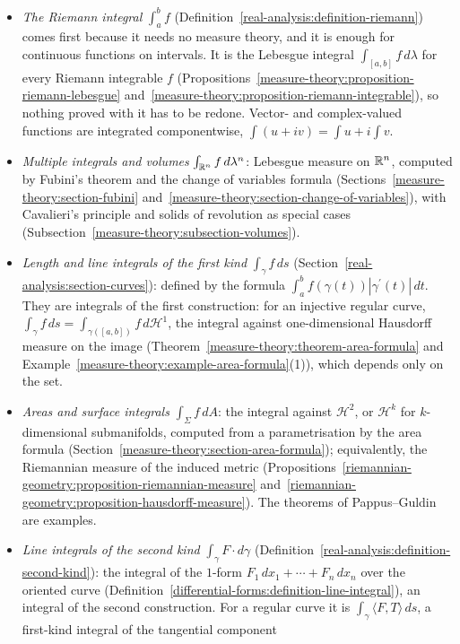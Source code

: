 \begin{itemize}
\item \emph{The Riemann integral} $\int_a^bf$ (Definition~\ref{real-analysis:definition-riemann}) comes first because it needs no measure theory, and it is enough for continuous functions on intervals. It is the
Lebesgue integral $\int_{[a,b]}f\,d\lambda$ for every Riemann integrable $f$ (Propositions~\ref{measure-theory:proposition-riemann-lebesgue} and~\ref{measure-theory:proposition-riemann-integrable}), so nothing proved
with it has to be redone. Vector- and complex-valued functions are integrated componentwise, $\int(u + iv) = \int u + i\int v$.
\item \emph{Multiple integrals and volumes} $\int_{\mathbb{R}^n}f\,d\lambda^n$: Lebesgue measure on $\mathbb{R}^n$, computed by Fubini's theorem and the change of variables formula
(Sections~\ref{measure-theory:section-fubini} and~\ref{measure-theory:section-change-of-variables}), with Cavalieri's principle and solids of revolution as special cases
(Subsection~\ref{measure-theory:subsection-volumes}).
\item \emph{Length and line integrals of the first kind} $\int_\gamma f\,ds$ (Section~\ref{real-analysis:section-curves}): defined by the formula $\int_a^bf(\gamma(t))|\gamma^{\prime}(t)|\,dt$. They are integrals of the first
construction: for an injective regular curve, $\int_\gamma f\,ds = \int_{\gamma([a,b])}f\,d\mathcal{H}^1$, the integral against one-dimensional Hausdorff measure on the image (Theorem~\ref{measure-theory:theorem-area-formula} and
Example~\ref{measure-theory:example-area-formula}(1)), which depends only on the set.
\item \emph{Areas and surface integrals} $\int_\Sigma f\,dA$: the integral against $\mathcal{H}^2$, or $\mathcal{H}^k$ for $k$-dimensional submanifolds, computed from a parametrisation by the area formula
(Section~\ref{measure-theory:section-area-formula}); equivalently, the Riemannian measure of the induced metric (Propositions~\ref{riemannian-geometry:proposition-riemannian-measure}
and~\ref{riemannian-geometry:proposition-hausdorff-measure}). The theorems of Pappus--Guldin are examples.
\item \emph{Line integrals of the second kind} $\int_\gamma F \cdot d\gamma$ (Definition~\ref{real-analysis:definition-second-kind}): the integral of the $1$-form $F_1\,dx_1 + \cdots + F_n\,dx_n$ over the oriented
curve (Definition~\ref{differential-forms:definition-line-integral}), an integral of the second construction. For a regular curve it is $\int_\gamma\langle F, T\rangle\,ds$, a first-kind integral of the tangential component

\end{itemize}
